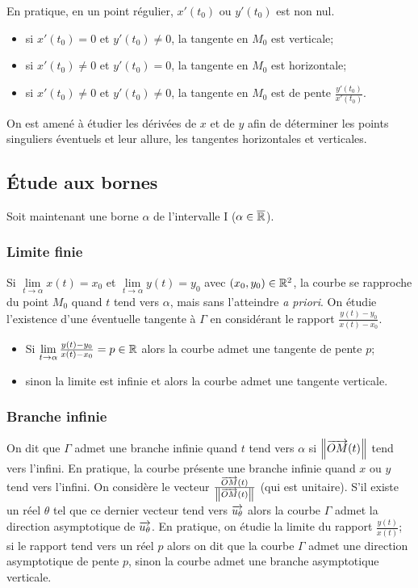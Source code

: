 En pratique, en un point régulier, $x'(t_0)$ ou $y'(t_0)$ est non nul.
\begin{itemize}
\item si $x'(t_0)=0$ et $y'(t_0) \neq 0$, la tangente en $M_0$ est verticale;
\item si $x'(t_0) \neq 0$ et $y'(t_0) = 0$, la tangente en $M_0$ est horizontale;
\item si $x'(t_0) \neq 0$ et $y'(t_0) \neq 0$, la tangente en $M_0$ est de pente $\frac{y'(t_0)}{x'(t_0)}$.
\end{itemize}
On est amené à étudier les dérivées de $x$ et de $y$ afin de déterminer les points singuliers éventuels et leur allure, les tangentes horizontales et verticales.

\subsection{Étude aux bornes}
Soit maintenant une borne $\alpha$ de l'intervalle I ($\alpha \in \overline{\mathbb{R}}$).

\subsubsection{Limite finie}
Si $\lim\limits_{t \to \alpha}{x(t)}=x_0$ et $\lim\limits_{t \to \alpha}{y(t)}=y_0$ avec $(x_0,y_0) \in \mathbb{R}^2$, la courbe se rapproche du point $M_0$ quand $t$ tend vers $\alpha$, mais sans l'atteindre \emph{a priori}. On étudie l'existence d'une éventuelle tangente à $\Gamma$ en considérant le rapport $\frac{y(t)-y_0}{x(t)-x_0}$.
\begin{itemize}
\item Si $\lim\limits_{t \to \alpha}\frac{y(t)-y_0}{x(t)-x_0}=p \in \mathbb{R}$ alors la courbe admet une tangente de pente $p$;
\item sinon la limite est infinie et alors la courbe admet une tangente verticale.
\end{itemize}

\subsubsection{Branche infinie}
On dit que $\Gamma$ admet une branche infinie quand $t$ tend vers $\alpha$ si $\left\lVert\overrightarrow{OM}(t)\right\rVert$ tend vers l'infini. En pratique, la courbe présente une branche infinie quand $x$ ou $y$ tend vers l'infini. On considère le vecteur $\frac{\overrightarrow{OM}(t)}{\left\lVert\overrightarrow{OM}(t)\right\rVert}$ (qui est unitaire). S'il existe un réel $\theta$ tel que ce dernier vecteur tend vers $\overrightarrow{u_\theta}$ alors la courbe $\Gamma$ admet la direction asymptotique de $\overrightarrow{u_\theta}$. En pratique, on étudie la limite du rapport $\frac{y(t)}{x(t)}$; si le rapport tend vers un réel $p$ alors on dit que la courbe $\Gamma$ admet une direction asymptotique de pente $p$, sinon la courbe admet une branche asymptotique verticale.

